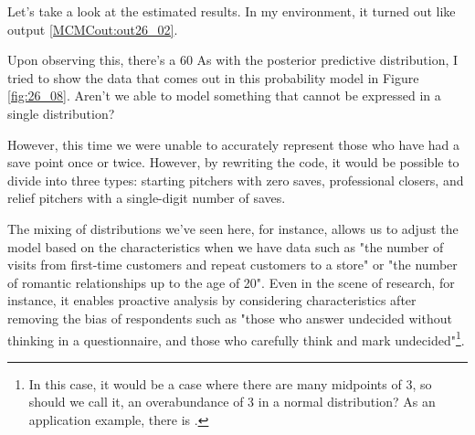 \documentclass{ltjsbook}
\begin{document}
Let's take a look at the estimated results. In my environment, it turned out like output \ref{MCMCout:out26_02}.

Upon observing this, there's a 60%
As with the posterior predictive distribution, I tried to show the data that comes out in this probability model in Figure \ref{fig:26_08}. Aren't we able to model something that cannot be expressed in a single distribution?

However, this time we were unable to accurately represent those who have had a save point once or twice. However, by rewriting the code, it would be possible to divide into three types: starting pitchers with zero saves, professional closers, and relief pitchers with a single-digit number of saves.

The mixing of distributions we've seen here, for instance, allows us to adjust the model based on the characteristics when we have data such as "the number of visits from first-time customers and repeat customers to a store" or "the number of romantic relationships up to the age of 20". Even in the scene of research, for instance, it enables proactive analysis by considering characteristics after removing the bias of respondents such as "those who answer undecided without thinking in a questionnaire, and those who carefully think and mark undecided"\footnote{In this case, it would be a case where there are many midpoints of 3, so should we call it, an overabundance of 3 in a normal distribution? As an application example, there is \textcite{shimizu2018}.}.
\end{document}
